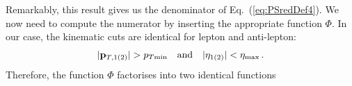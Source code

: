 \documentclass[10pt,a4paper]{article}
\begin{document}
Remarkably, this result gives us the denominator of
Eq.~(\ref{eq:PSredDef4}). We now need to compute the numerator by
inserting the appropriate function $\Phi$. In our case, the kinematic
cuts are identical for lepton and anti-lepton:
\begin{equation}
|\mathbf{p}_{T,1(2)}| > p_{T\rm min}\quad\mbox{and}\quad |\eta_{1(2)}| < \eta_{\rm max}\,.
\end{equation}
Therefore, the function $\Phi$ factorises into two identical functions
\end{document}
